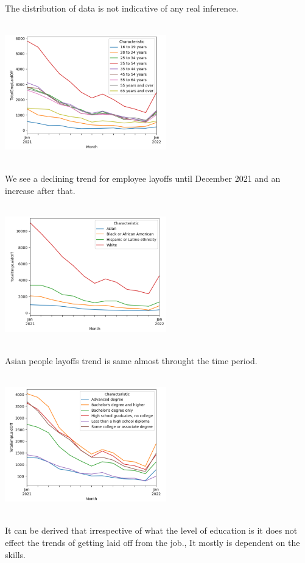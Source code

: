 \documentclass[fleqn,10pt]{SelfArx} %
\begin{document}
The distribution of data is not indicative of any real inference.

\includegraphics[width=7cm, height=6cm]{t3_line_1.png}

We see a declining trend for employee layoffs until December 2021 and an increase after that.

\includegraphics[width=7cm, height=6cm]{t3_line_2.png}

Asian people layoffs trend is same almost throught the time period.

\includegraphics[width=7cm, height=6cm]{t3_line_3.png}

It can be derived that irrespective of what the level of education is it does not effect the trends of getting laid off from the job., It mostly is dependent on the skills.
\end{document}
